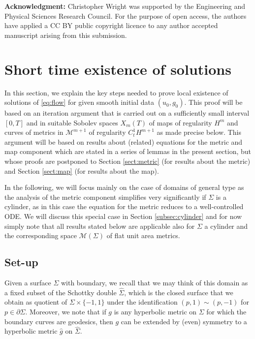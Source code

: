 \documentclass[10pt,reqno]{amsart}
\theoremstyle{plain}
\theoremstyle{definition}
\numberwithin{equation}{section}
\newcommand{\Si}{\Sigma}
\newcommand{\MM}{\mathcal{M}} %
\begin{document}
\textbf{Acknowledgment:}
Christopher Wright was supported by the Engineering and Physical Sciences Research
Council. For the purpose of open access, the authors have applied a CC BY public copyright licence to any author accepted manuscript arising from this submission.
\section{Short time existence of solutions}\label{sect:main}
In this section, we explain the key steps needed to prove local existence of solutions of \eqref{eq:flow} for given smooth initial data $(u_0,g_0)$. This proof will be based on an iteration argument that is carried out on a sufficiently small interval $[0,T]$ and in suitable Sobolev spaces $X_m(T)$ of maps of regularity $H^m$ and  curves of metrics in $\MM^{m+1}$ of regularity $C^1_tH^{m+1}$ as made precise below. This argument will be based on results about  (related) equations for the metric and map component which are stated in a series of lemmas in the present section, but whose proofs are postponed to Section \ref{sect:metric} (for results about the metric) and Section \ref{sect:map} (for results about the map). 

In the following, we will focus mainly on the case of domains of general type as the analysis of the metric component simplifies very significantly if $\Si$ is a cylinder, as in this case the equation for the metric reduces to a well-controlled ODE. We will discuss this special case in Section \ref{subsec:cylinder} and for now simply note that all results stated below are applicable also for $\Si$ a cylinder and the corresponding space $\MM(\Si)$ of flat unit area metrics. 

\subsection{Set-up}
Given a surface $\Si$ with boundary, we recall that we may think of this domain as a fixed subset of the Schottky double $\hat\Si$, which is the closed surface that we obtain as quotient of $\Si\times\{-1,1\}$ under the identification $(p,1)\sim(p,-1)$ for $p\in\partial \Si$. Moreover, we note that if $g$ is any hyperbolic metric on $\Si$ for which the boundary curves are geodesics, then $g$ can be extended by (even) symmetry to a hyperbolic metric $\hat g$ on $\hat\Si$. %
\end{document}
